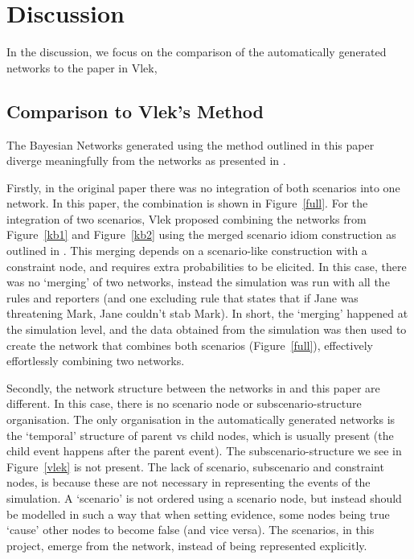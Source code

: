 \section{Discussion}
In the discussion, we focus on the comparison of the automatically generated networks to the paper in Vlek, 


\subsection{Comparison to Vlek's Method}

The Bayesian Networks generated using the method outlined in this paper diverge meaningfully from the networks as presented in \citet{Vlek2015}. 

Firstly, in the original paper there was no integration of both scenarios into one network. In this paper, the combination is shown in Figure~\ref{full}. For the integration of two scenarios, Vlek proposed combining the networks from Figure~\ref{kb1} and Figure~\ref{kb2} using the merged scenario idiom construction as outlined in \citet{Vlek2014}. This merging depends on a scenario-like construction with a constraint node, and requires extra probabilities to be elicited. In this case, there was no `merging' of two networks, instead the simulation was run with all the rules and reporters (and one excluding rule that states that if Jane was threatening Mark, Jane couldn't stab Mark). In short, the `merging' happened at the simulation level, and the data obtained from the simulation was then used to create the network that combines both scenarios (Figure~\ref{full}), effectively effortlessly combining two networks.

Secondly, the network structure between the networks in \citet{Vlek2015} and this paper are different. In this case, there is no scenario node or subscenario-structure organisation. The only organisation in the automatically generated networks is the `temporal' structure of parent vs child nodes, which is usually present (the child event happens after the parent event). The subscenario-structure we see in Figure~\ref{vlek} is not present. The lack of scenario, subscenario and constraint nodes, is because these are not necessary in representing the events of the simulation. A `scenario' is not ordered using a scenario node, but instead should be modelled in such a way that when setting evidence, some nodes being true `cause' other nodes to become false (and vice versa). The scenarios, in this project, emerge from the network, instead of being represented explicitly.

